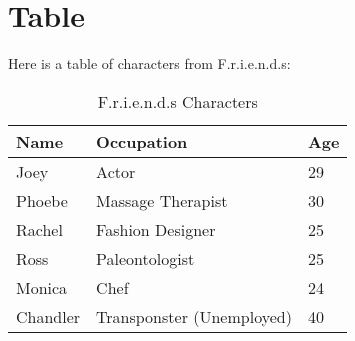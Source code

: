 \documentclass{article}
\begin{document}
\section{Table}
Here is a table of characters from F.r.i.e.n.d.s:
\begin{table}[h]
    \centering
    \caption{F.r.i.e.n.d.s Characters}
    \begin{tabular}{@{}lll@{}}
        \toprule
        \textbf{Name} & \textbf{Occupation}      & \textbf{Age} \\ \midrule
        Joey         & Actor                    & 29           \\
        Phoebe       & Massage Therapist        & 30           \\
        Rachel       & Fashion Designer         & 25           \\
        Ross         & Paleontologist           & 25           \\
        Monica       & Chef                     & 24           \\ 
        Chandler     & Transponster (Unemployed) & 40           \\ \bottomrule
    \end{tabular}
\end{table}
\end{document}
